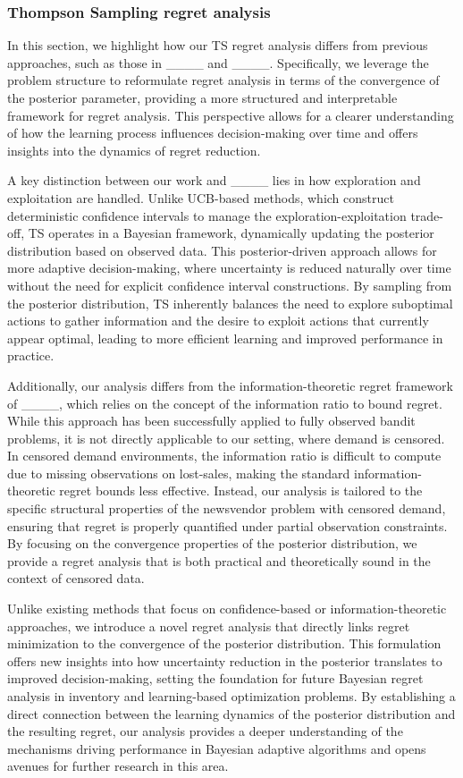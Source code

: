\subsubsection{Thompson Sampling regret analysis}
In this section, we highlight how our TS regret analysis differs from previous approaches, such as those in ____ and ____. Specifically, we leverage the problem structure to reformulate regret analysis in terms of the convergence of the posterior parameter, providing a more structured and interpretable framework for regret analysis. This perspective allows for a clearer understanding of how the learning process influences decision-making over time and offers insights into the dynamics of regret reduction.

A key distinction between our work and ____ lies in how exploration and exploitation are handled. Unlike UCB-based methods, which construct deterministic confidence intervals to manage the exploration-exploitation trade-off, TS operates in a Bayesian framework, dynamically updating the posterior distribution based on observed data. This posterior-driven approach allows for more adaptive decision-making, where uncertainty is reduced naturally over time without the need for explicit confidence interval constructions. By sampling from the posterior distribution, TS inherently balances the need to explore suboptimal actions to gather information and the desire to exploit actions that currently appear optimal, leading to more efficient learning and improved performance in practice.

Additionally, our analysis differs from the information-theoretic regret framework of ____, which relies on the concept of the information ratio to bound regret. While this approach has been successfully applied to fully observed bandit problems, it is not directly applicable to our setting, where demand is censored. In censored demand environments, the information ratio is difficult to compute due to missing observations on lost-sales, making the standard information-theoretic regret bounds less effective. Instead, our analysis is tailored to the specific structural properties of the newsvendor problem with censored demand, ensuring that regret is properly quantified under partial observation constraints. By focusing on the convergence properties of the posterior distribution, we provide a regret analysis that is both practical and theoretically sound in the context of censored data.

Unlike existing methods that focus on confidence-based or information-theoretic approaches, we introduce a novel regret analysis that directly links regret minimization to the convergence of the posterior distribution. This formulation offers new insights into how uncertainty reduction in the posterior translates to improved decision-making, setting the foundation for future Bayesian regret analysis in inventory and learning-based optimization problems. By establishing a direct connection between the learning dynamics of the posterior distribution and the resulting regret, our analysis provides a deeper understanding of the mechanisms driving performance in Bayesian adaptive algorithms and opens avenues for further research in this area.

